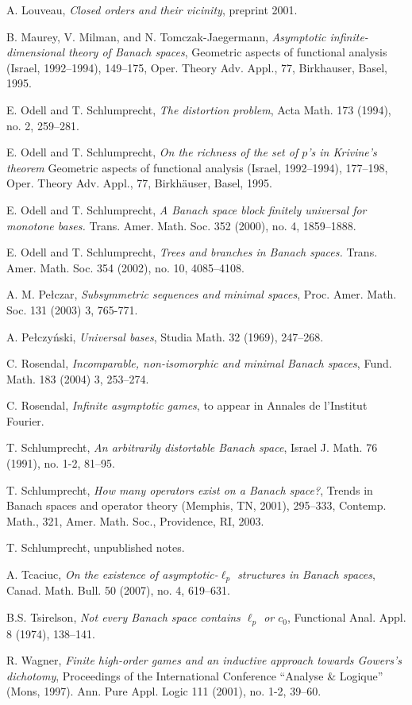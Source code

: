 \documentclass[10pt]{amsart}
\numberwithin{equation}{section}
\begin{document}
\begin{thebibliography}{999}
A. Louveau, {\em Closed orders and their vicinity},  preprint 2001.

 B. Maurey, V. Milman, and N. Tomczak-Jaegermann,
{\em Asymptotic infinite-dimensional theory of Banach spaces},
Geometric aspects of functional analysis (Israel, 1992--1994),  149--175,
Oper. Theory Adv. Appl., 77, Birkhauser, Basel, 1995.

 E. Odell and T. Schlumprecht, {\em The distortion
    problem},  Acta Math.  173  (1994),  no. 2, 259--281.

 E. Odell and T. Schlumprecht,
{\em On the richness of the set of $p$'s in Krivine's theorem}  Geometric
aspects of functional analysis (Israel, 1992--1994),  177--198, Oper. Theory
Adv. Appl., 77, Birkh\"auser, Basel, 1995.

 E. Odell and T. Schlumprecht, {\em A Banach space block finitely universal for monotone bases.}
Trans. Amer. Math. Soc. 352 (2000), no. 4, 1859--1888.

E. Odell and T. Schlumprecht,
{\em Trees and branches in Banach spaces. } Trans. Amer. Math. Soc.  354
(2002),  no. 10, 4085--4108.

 A. M. Pe\l czar, {\em Subsymmetric sequences and minimal
spaces}, Proc. Amer. Math. Soc.  131 (2003) 3, 765-771.

 A. Pe\l czy\'nski, {\em Universal bases},  Studia Math.   32  (1969), 247--268.

 C. Rosendal, {\em Incomparable, non-isomorphic and minimal Banach spaces},
Fund. Math.   183  (2004) 3, 253--274.

 C. Rosendal, {\em Infinite asymptotic games}, to appear in Annales de l'Institut Fourier.

 T. Schlumprecht, {\em An arbitrarily distortable Banach space},  Israel J. Math.  76  (1991),  no. 1-2, 81--95.

 T. Schlumprecht, {\em How many operators exist on a Banach space?},
Trends in Banach spaces and operator theory (Memphis, TN, 2001),  295--333,
Contemp. Math., 321, Amer. Math. Soc., Providence, RI, 2003.

 T. Schlumprecht, unpublished notes.

 A. Tcaciuc, {\em On the existence of asymptotic-$\ell_p$
    structures in Banach spaces}, Canad.  Math. Bull. 50 (2007), no. 4, 619--631.

 B.S. Tsirelson,
{\em Not every Banach space contains $\ell_p$ or $c_0$}, Functional Anal. Appl. 8 (1974), 138--141.

 R. Wagner, {\em Finite high-order games and an inductive approach towards Gowers's dichotomy},
Proceedings of the International Conference ``Analyse \& Logique'' (Mons,
1997).  Ann. Pure Appl. Logic  111  (2001),  no. 1-2, 39--60.
\end{thebibliography}
\end{document}
